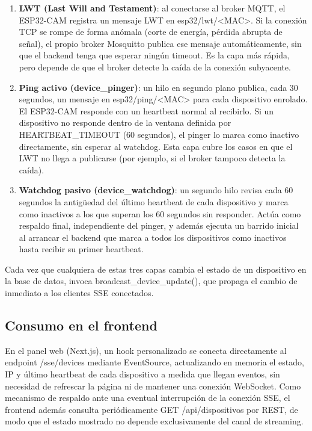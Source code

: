\begin{enumerate}
    \item \textbf{LWT (Last Will and Testament)}: al conectarse al broker MQTT, el ESP32-CAM registra un mensaje LWT en esp32/lwt/<MAC>. Si la conexión TCP se rompe de forma anómala (corte de energía, pérdida abrupta de señal), el propio broker Mosquitto publica ese mensaje automáticamente, sin que el backend tenga que esperar ningún timeout. Es la capa más rápida, pero depende de que el broker detecte la caída de la conexión subyacente.

    \item \textbf{Ping activo (device\_pinger)}: un hilo en segundo plano publica, cada 30 segundos, un mensaje en esp32/ping/<MAC> para cada dispositivo enrolado. El ESP32-CAM responde con un heartbeat normal al recibirlo. Si un dispositivo no responde dentro de la ventana definida por HEARTBEAT\_TIMEOUT (60 segundos), el pinger lo marca como inactivo directamente, sin esperar al watchdog. Esta capa cubre los casos en que el LWT no llega a publicarse (por ejemplo, si el broker tampoco detecta la caída).

    \item \textbf{Watchdog pasivo (device\_watchdog)}: un segundo hilo revisa cada 60 segundos la antigüedad del último heartbeat de cada dispositivo y marca como inactivos a los que superan los 60 segundos sin responder. Actúa como respaldo final, independiente del pinger, y además ejecuta un barrido inicial al arrancar el backend que marca a todos los dispositivos como inactivos hasta recibir su primer heartbeat.
\end{enumerate}

Cada vez que cualquiera de estas tres capas cambia el estado de un dispositivo en la base de datos, invoca broadcast\_device\_update(), que propaga el cambio de inmediato a los clientes SSE conectados.

\subsection{Consumo en el frontend}

En el panel web (Next.js), un hook personalizado se conecta directamente al endpoint /sse/devices mediante EventSource, actualizando en memoria el estado, IP y último heartbeat de cada dispositivo a medida que llegan eventos, sin necesidad de refrescar la página ni de mantener una conexión WebSocket. Como mecanismo de respaldo ante una eventual interrupción de la conexión SSE, el frontend además consulta periódicamente GET /api/dispositivos por REST, de modo que el estado mostrado no depende exclusivamente del canal de streaming.

